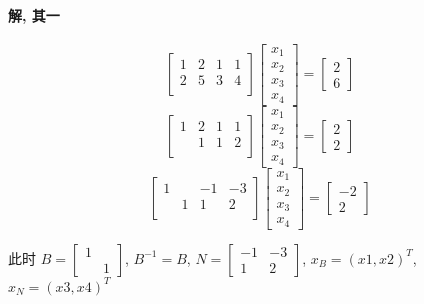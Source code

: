 \documentclass[a4paper]{article}
\begin{document}
\paragraph{解, 其一}
\[
\left[\begin{array}{cccc}
    1 &2& 1& 1\\
    2& 5& 3 & 4\\
\end{array}\right]
\left[\begin{array}{c} x_1 \\ x_2 \\ x_3 \\ x_4  \end{array}\right] =
\left[\begin{array}{c} 2\\ 6\end{array}\right]
\]
\[
\left[\begin{array}{cccc}
    1 &2& 1& 1\\
     & 1& 1 & 2\\
\end{array}\right]
\left[\begin{array}{c} x_1 \\ x_2 \\ x_3 \\ x_4  \end{array}\right] =
\left[\begin{array}{c} 2\\ 2\end{array}\right]
\]
\[
\left[\begin{array}{cccc}
    1 & & -1& -3\\
     & 1& 1 & 2\\
\end{array}\right]
\left[\begin{array}{c} x_1 \\ x_2 \\ x_3 \\ x_4  \end{array}\right] =
\left[\begin{array}{c} -2\\ 2\end{array}\right]
\]

此时 $B = \begin{bmatrix}
    1 & \\
      & 1
\end{bmatrix}$, $B^{-1} = B$, $N = \begin{bmatrix}
    -1 & -3 \\
    1 & 2
\end{bmatrix}$, $x_B = (x1,x2)^T$, $x_N = (x3,x4)^T$
\end{document}
